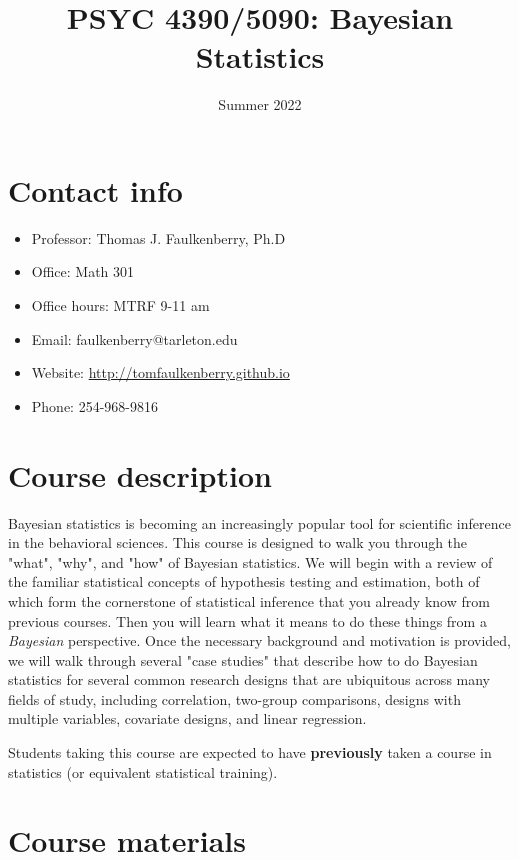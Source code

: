 \documentclass[10pt]{article}
\date{Summer 2022}
\title{PSYC 4390/5090: Bayesian Statistics}
\begin{document}
\maketitle

\section*{Contact info}
\label{sec:org292ff12}
\begin{itemize}
\item Professor: Thomas J. Faulkenberry, Ph.D
\item Office: Math 301
\item Office hours: MTRF 9-11 am
\item Email: faulkenberry@tarleton.edu
\item Website: \url{http://tomfaulkenberry.github.io}
\item Phone: 254-968-9816
\end{itemize}

\section*{Course description}
\label{sec:org6055c4c}

Bayesian statistics is becoming an increasingly popular tool for scientific inference in the behavioral sciences. This course is designed to walk you through the "what", "why", and "how" of Bayesian statistics. We will begin with a review of the familiar statistical concepts of hypothesis testing and estimation, both of which form the cornerstone of statistical inference that you already know from previous courses. Then you will learn what it means to do these things from a \emph{Bayesian} perspective. Once the necessary background and motivation is provided, we will walk through several "case studies" that describe how to do Bayesian statistics for several common research designs that are ubiquitous across many fields of study, including correlation, two-group comparisons, designs with multiple variables, covariate designs, and linear regression.  

Students taking this course are expected to have \textbf{previously} taken a course in statistics (or equivalent statistical training). 

\section*{Course materials}
\label{sec:org884a0c7}
\end{document}
